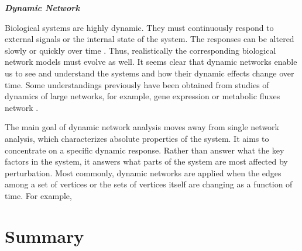 \documentclass[12pt, oneside]{report}
\begin{document}
\textbf{\textit{Dynamic Network}}

Biological systems are highly dynamic. They must continuously respond to external signals or the internal state of the system. The responses can be altered slowly or quickly over time \citep{Peer:2011jd}. Thus, realistically the corresponding biological network models must evolve as well. It seems clear that dynamic networks enable us to see and understand the systems and how their dynamic effects change over time. Some understandings previously have been obtained from studies of dynamics of large networks, for example, gene expression or metabolic fluxes network \citep{Idekerdiffnet}.

The main goal of dynamic network analysis moves away from single network analysis, which characterizes absolute properties of the system. It aims to concentrate on a specific dynamic response. Rather than answer what the key factors in the system, it answers what parts of the system are most affected by perturbation. Most commonly, dynamic networks are applied when the edges among a set of vertices or the sets of vertices itself are changing as a function of time. For example, 


\section*{Summary}
\end{document}
